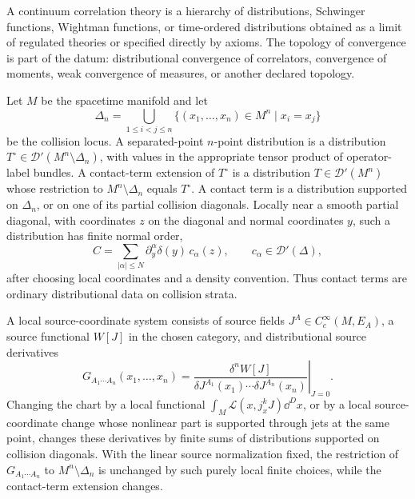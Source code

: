 \begin{definition}
\label{def:continuum-correlation-theory-opening}
  A continuum correlation theory is a hierarchy of distributions, Schwinger
  functions, Wightman functions, or time-ordered distributions obtained as a
  limit of regulated theories or specified directly by axioms.  The topology
  of convergence is part of the datum: distributional convergence of
  correlators, convergence of moments, weak convergence of measures, or
  another declared topology.
\end{definition}

\begin{definition}
\label{def:contact-terms-source-chart}
Let \(M\) be the spacetime manifold and let
\[
  \Delta_n=\bigcup_{1\le i<j\le n}\{(x_1,\ldots,x_n)\in M^n\mid x_i=x_j\}
\]
be the collision locus.  A separated-point \(n\)-point distribution is a
distribution \(T^\circ\in\mathcal D'(M^n\setminus\Delta_n)\), with values in
the appropriate tensor product of operator-label bundles.  A contact-term
extension of \(T^\circ\) is a distribution \(T\in\mathcal D'(M^n)\) whose
restriction to \(M^n\setminus\Delta_n\) equals \(T^\circ\).  A contact term is
a distribution supported on \(\Delta_n\), or on one of its partial collision
diagonals.  Locally near a smooth partial diagonal, with coordinates \(z\) on
the diagonal and normal coordinates \(y\), such a distribution has finite
normal order,
\[
  C
  =
  \sum_{|\alpha|\le N}
  \partial_y^\alpha\delta(y)\,c_\alpha(z),
  \qquad
  c_\alpha\in\mathcal D'(\Delta),
\]
after choosing local coordinates and a density convention.  Thus contact
terms are ordinary distributional data on collision strata.

A local source-coordinate system consists of source fields
\(J^A\in C_c^\infty(M,E_A)\), a source functional \(W[J]\) in the chosen
category, and distributional source derivatives
\[
  G_{A_1\cdots A_n}(x_1,\ldots,x_n)
  =
  \left.
  \frac{\delta^n W[J]}
       {\delta J^{A_1}(x_1)\cdots\delta J^{A_n}(x_n)}
  \right|_{J=0}.
\]
Changing the chart by a local functional
\(\int_M\mathcal L(x,j_x^kJ)\dd^Dx\), or by a local source-coordinate change
whose nonlinear part is supported through jets at the same point, changes
these derivatives by finite sums of distributions supported on collision
diagonals.  With the linear source normalization fixed, the restriction of
\(G_{A_1\cdots A_n}\) to \(M^n\setminus\Delta_n\) is unchanged by such
purely local finite choices, while the contact-term extension changes.
\end{definition}

